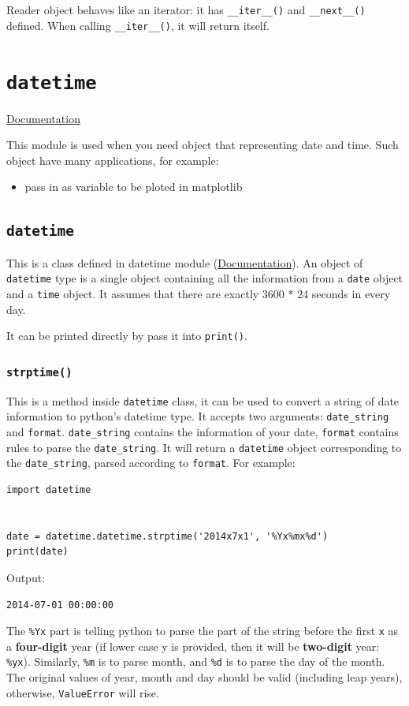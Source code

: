 \documentclass[12pt]{book}
\begin{document}
Reader object behaves like an iterator: it has \texttt{\_\_iter\_\_()} and \texttt{\_\_next\_\_()} defined. When calling \texttt{\_\_iter\_\_()}, it will return itself. 
\chapter{\texttt{datetime}}
\label{sec:orgb1831df}
\href{https://docs.python.org/3/library/datetime.html}{Documentation}

This module is used when you need object that representing date and time. Such object have many applications, for example:
\begin{itemize}
\item pass in as variable to be ploted in matplotlib
\end{itemize}

\section{\texttt{datetime}}
\label{sec:org902ca20}
This is a class defined in datetime module (\href{https://docs.python.org/3/library/datetime.html\#datetime.datetime}{Documentation}). An object of \texttt{datetime} type is a single object containing all the information from a \texttt{date} object and a \texttt{time} object. It assumes that there are exactly 3600 * 24 seconds in every day.

It can be printed directly by pass it into \texttt{print()}.
\subsection{\texttt{strptime()}}
\label{sec:orgf7e2dfd}
This is a method inside \texttt{datetime} class, it can be used to convert a string of date information to python's datetime type. It accepts two arguments: \texttt{date\_string} and \texttt{format}. \texttt{date\_string} contains the information of your date, \texttt{format} contains rules to parse the \texttt{date\_string}. It will return a \texttt{datetime} object corresponding to the \texttt{date\_string}, parsed according to \texttt{format}. For example:
\begin{verbatim}
import datetime


date = datetime.datetime.strptime('2014x7x1', '%Yx%mx%d')
print(date)
\end{verbatim}
Output:
\begin{verbatim}
2014-07-01 00:00:00
\end{verbatim}
The \texttt{\%Yx} part is telling python to parse the part of the string before the first \texttt{x} as a \textbf{four-digit} year (if lower case y is provided, then it will be \textbf{two-digit} year: \texttt{\%yx}). Similarly, \texttt{\%m} is to parse month, and \texttt{\%d} is to parse the day of the month. The original values of year, month and day should be valid (including leap years), otherwise, \texttt{ValueError} will rise.
\end{document}

